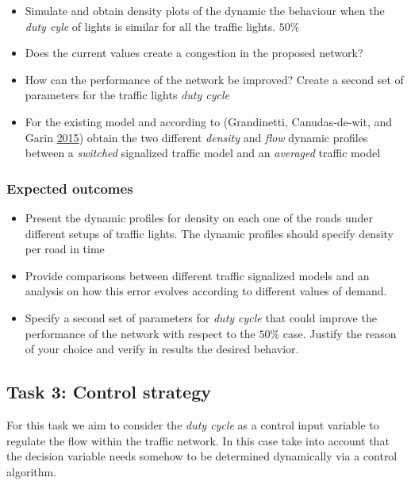 \documentclass[]{book}
\theoremstyle{definition}
\theoremstyle{definition}
\theoremstyle{definition}
\theoremstyle{remark}
\begin{document}
\begin{itemize}
\item
  Simulate and obtain density plots of the dynamic the behaviour when
  the \emph{duty cyle} of lights is similar for all the traffic lights.
  \(50\%\)
\item
  Does the current values create a congestion in the proposed network?
\item
  How can the performance of the network be improved? Create a second
  set of parameters for the traffic lights \emph{duty cycle}
\item
  For the existing model and according to (Grandinetti, Canudas-de-wit,
  and Garin \protect\hyperlink{ref-Grandinetti2015}{2015}) obtain the
  two different \emph{density} and \emph{flow} dynamic profiles between
  a \emph{switched} signalized traffic model and an \emph{averaged}
  traffic model
\end{itemize}

\hypertarget{expected-outcomes-1}{%
\subsubsection*{Expected outcomes}\label{expected-outcomes-1}}

\begin{itemize}
\item
  Present the dynamic profiles for density on each one of the roads
  under different setups of traffic lights. The dynamic profiles should
  specify density per road in time
\item
  Provide comparisons between different traffic signalized models and an
  analysis on how this error evolves according to different values of
  demand.
\item
  Specify a second set of parameters for \emph{duty cycle} that could
  improve the performance of the network with respect to the \(50\%\)
  case. Justify the reason of your choice and verify in results the
  desired behavior.
\end{itemize}

\hypertarget{task-3-control-strategy}{%
\subsection*{Task 3: Control strategy}\label{task-3-control-strategy}}

For this task we aim to consider the \emph{duty cycle} as a control
input variable to regulate the flow within the traffic network. In this
case take into account that the decision variable needs somehow to be
determined dynamically via a control algorithm.
\end{document}
